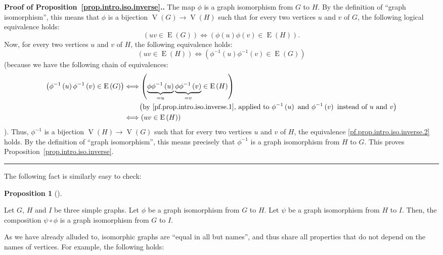 \documentclass[numbers=enddot,12pt,final,onecolumn,notitlepage]{scrartcl}%
\theoremstyle{definition}
\newtheorem{prop}[theo]{Proposition}
\newenvironment{proposition}[1][]
{\begin{prop}[#1]\begin{leftbar}}
{\end{leftbar}\end{prop}}
\newenvironment{proof}[1][Proof]{\noindent\textbf{#1.} }{\ \rule{0.5em}{0.5em}}
\newcommand{\tup}[1]{\left( #1 \right)}
\newcommand{\verts}[1]{\operatorname{V}\left( #1 \right)}
\newcommand{\edges}[1]{\operatorname{E}\left( #1 \right)}
\begin{document}
\begin{proof}[Proof of Proposition~\ref{prop.intro.iso.inverse}.]
The map $\phi$ is a graph isomorphism from $G$ to $H$. By the
definition of ``graph isomorphism'', this means that $\phi$ is a
bijection $\verts{G} \to \verts{H}$ such that for every two
vertices $u$ and $v$ of $G$, the following logical equivalence holds:
\begin{equation}
\left( uv \in \edges{G} \right)
\Longleftrightarrow
\left( \phi\tup{u}\phi\tup{v} \in \edges{H} \right) .
\label{pf.prop.intro.iso.inverse.1}
\end{equation}
Now, for every two vertices $u$ and $v$ of $H$, the following
equivalence holds:
\begin{equation}
\left( uv \in \edges{H} \right)
\Longleftrightarrow
\left( \phi^{-1}\tup{u}\phi^{-1}\tup{v} \in \edges{G} \right)
\label{pf.prop.intro.iso.inverse.2}
\end{equation}
(because we have the following chain of equivalences:
\begin{align*}
\left( \phi^{-1}\tup{u}\phi^{-1}\tup{v} \in \edges{G} \right)
& \Longleftrightarrow
\left( \underbrace{\phi{\phi^{-1}\tup{u}}}_{=u}
   \underbrace{\phi{\phi^{-1}\tup{v}}}_{=v} \in \edges{H} \right) \\
&\qquad
\left( \text{by \eqref{pf.prop.intro.iso.inverse.1}, applied to }
\phi^{-1}\tup{u} \text{ and } \phi^{-1}\tup{v} \text{ instead of } u
\text{ and } v \right) \\
& \Longleftrightarrow
\left( uv \in \edges{H} \right)
\end{align*}
). Thus, $\phi^{-1}$ is a bijection $\verts{H} \to \verts{G}$ such
that for every two vertices $u$ and $v$ of $H$, the equivalence
\eqref{pf.prop.intro.iso.inverse.2} holds. By the definition of
``graph isomorphism'', this means precisely that $\phi^{-1}$ is a
graph isomorphism from $H$ to $G$. This proves
Proposition~\ref{prop.intro.iso.inverse}.
\end{proof}

The following fact is similarly easy to check:

\begin{proposition} \label{prop.intro.iso.comp}
Let $G$, $H$ and $I$ be three simple graphs. Let $\phi$ be a graph
isomorphism from $G$ to $H$. Let $\psi$ be a graph isomorphism from
$H$ to $I$. Then, the composition $\psi \circ \phi$ is a graph
isomorphism from $G$ to $I$.
\end{proposition}

As we have already alluded to, isomorphic graphs are ``equal in all
but names'', and thus share all properties that do not depend on the
names of vertices. For example, the following holds:
\end{document}
